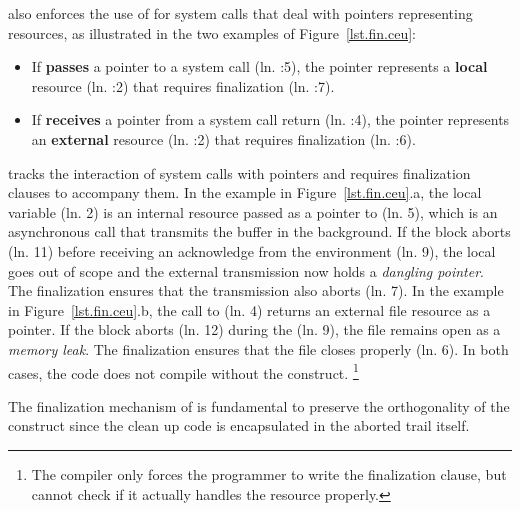 \CEU also enforces the use of  for system calls that deal with
pointers representing resources, as illustrated in the two examples of
Figure~\ref{lst.fin.ceu}:
%
\begin{itemize}
    \item If \CEU \textbf{passes} a pointer to a system call (ln. \ax:5), the
          pointer represents a \textbf{local} resource (ln. \ax:2) that
          requires finalization (ln. \ax:7).
    \item If \CEU \textbf{receives} a pointer from a system call return
          (ln.  \bx:4), the pointer represents an \textbf{external} resource
          (ln. \bx:2) that requires finalization (ln. \bx:6).
\end{itemize}
%
\CEU tracks the interaction of system calls with pointers and requires
finalization clauses to accompany them.
%
In the example in Figure~\ref{lst.fin.ceu}.a, the local variable 
(ln. 2) is an internal resource passed as a pointer to  (ln. 5),
which is an asynchronous call that transmits the buffer in the background.
If the block aborts (ln. 11) before receiving an acknowledge from the
environment (ln. 9), the local  goes out of scope and the external
transmission now holds a \emph{dangling pointer}.
The finalization ensures that the transmission also aborts (ln. 7).
%
In the example in Figure~\ref{lst.fin.ceu}.b, the call to  (ln.
4) returns an external file resource as a pointer.
If the block aborts (ln. 12) during the  (ln. 9), the file
remains open as a \emph{memory leak}.
The finalization ensures that the file closes properly (ln. 6).
%
In both cases, the code does not compile without the 
construct.%
\footnote{
The compiler only forces the programmer to write the finalization clause, but
cannot check if it actually handles the resource properly.
}

The finalization mechanism of \CEU is fundamental to preserve the orthogonality
of the  construct since the clean up code is encapsulated in the
aborted trail itself.
